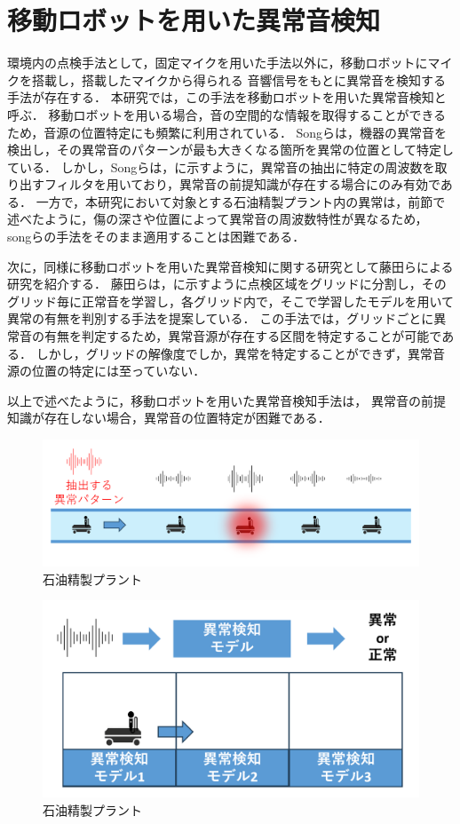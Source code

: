 \documentclass[../main]{subfiles}
\begin{document}
\section{移動ロボットを用いた異常音検知}
\label{sec:intro_my_purpose}

環境内の点検手法として，固定マイクを用いた手法以外に，移動ロボットにマイクを搭載し，搭載したマイクから得られる
音響信号をもとに異常音を検知する手法が存在する．
本研究では，この手法を移動ロボットを用いた異常音検知と呼ぶ．
移動ロボットを用いる場合，音の空間的な情報を取得することができるため，音源の位置特定にも頻繁に利用されている．
Songらは，機器の異常音を検出し，その異常音のパターンが最も大きくなる箇所を異常の位置として特定している．
しかし，Songらは，に示すように，異常音の抽出に特定の周波数を取り出すフィルタを用いており，異常音の前提知識が存在する場合にのみ有効である．
一方で，本研究において対象とする石油精製プラント内の異常は，前節で述べたように，傷の深さや位置によって異常音の周波数特性が異なるため，
songらの手法をそのまま適用することは困難である．

次に，同様に移動ロボットを用いた異常音検知に関する研究として藤田らによる研究を紹介する．
藤田らは，に示すように点検区域をグリッドに分割し，そのグリッド毎に正常音を学習し，各グリッド内で，そこで学習したモデルを用いて異常の有無を判別する手法を提案している．
この手法では，グリッドごとに異常音の有無を判定するため，異常音源が存在する区間を特定することが可能である．
しかし，グリッドの解像度でしか，異常を特定することができず，異常音源の位置の特定には至っていない．

以上で述べたように，移動ロボットを用いた異常音検知手法は，
異常音の前提知識が存在しない場合，異常音の位置特定が困難である．

\begin{figure}[t]
  \centering
  \includegraphics[keepaspectratio, width=1.0\linewidth]{chap2/supervised_prev_research.png}
  \caption{石油精製プラント}
  \label{fig:supervised_prev_research}
\end{figure}

\begin{figure}[t]
  \centering
  \includegraphics[keepaspectratio, width=1.0\linewidth]{chap2/fujita_previous_research.png}
  \caption{石油精製プラント}
  \label{fig:fujita_previous_research}
\end{figure}
\end{document}
